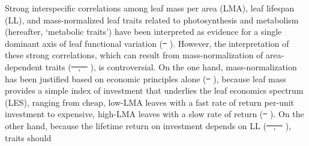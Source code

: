 \documentclass[
  12pt,
  letterpaper,
  DIV=11,
  numbers=noendperiod]{scrartcl}
\providecommand{\DIFadd}[1]{{\protect\color{blue}\uwave{#1}}} %
\providecommand{\DIFdel}[1]{{\protect\color{red}\sout{#1}}}                      %
\providecommand{\DIFaddbegin}{} %
\providecommand{\DIFaddend}{} %
\providecommand{\DIFdelbegin}{} %
\providecommand{\DIFdelend}{} %
\newcommand{\DIFscaledelfig}{0.5}
\newlength{\DIFdelgraphicswidth} %
\newlength{\DIFdelgraphicsheight} %
\newcommand{\DIFaddincludegraphics}[2][]{{\color{blue}\fbox{\DIFOincludegraphics[#1]{#2}}}} %
\newcommand{\DIFdelincludegraphics}[2][]{%
\sbox{\DIFdelgraphicsbox}{\DIFOincludegraphics[#1]{#2}}%
\settoboxwidth{\DIFdelgraphicswidth}{\DIFdelgraphicsbox} %
\settoboxtotalheight{\DIFdelgraphicsheight}{\DIFdelgraphicsbox} %
\scalebox{\DIFscaledelfig}{%
\parbox[b]{\DIFdelgraphicswidth}{\usebox{\DIFdelgraphicsbox}\\[-\baselineskip] \rule{\DIFdelgraphicswidth}{0em}}\llap{\resizebox{\DIFdelgraphicswidth}{\DIFdelgraphicsheight}{%
\setlength{\unitlength}{\DIFdelgraphicswidth}%
\begin{picture}(1,1)%
\thicklines\linethickness{2pt} %
{\color[rgb]{1,0,0}\put(0,0){\framebox(1,1){}}}%
{\color[rgb]{1,0,0}\put(0,0){\line( 1,1){1}}}%
{\color[rgb]{1,0,0}\put(0,1){\line(1,-1){1}}}%
\end{picture}%
}\hspace*{3pt}}} %
} %
\DeclareRobustCommand{\DIFaddbegin}{\DIFOaddbegin \let\includegraphics\DIFaddincludegraphics} %
\DeclareRobustCommand{\DIFaddend}{\DIFOaddend \let\includegraphics\DIFOincludegraphics} %
\DeclareRobustCommand{\DIFdelbegin}{\DIFOdelbegin \let\includegraphics\DIFdelincludegraphics} %
\DeclareRobustCommand{\DIFdelend}{\DIFOaddend \let\includegraphics\DIFOincludegraphics} %
\begin{document}
Strong interspecific correlations among leaf mass per area (LMA), leaf
lifespan (LL), and mass-normalized leaf traits related to photosynthesis
and metabolism (hereafter, `metabolic traits') have been interpreted as
evidence for a single dominant axis of leaf functional variation
(\DIFdelbegin \DIFdel{\mbox{%
\citeproc{ref-Wright2004a}{Wright et al. 2004}}\hspace{0pt}%
}\DIFdelend \DIFaddbegin \DIFadd{\mbox{%
\citeproc{ref-Wright2004a}{Wright et al., 2004}}\hspace{0pt}%
}\DIFaddend ). However, the
interpretation of these strong correlations, which can result from
mass-normalization of area-dependent traits
(\DIFdelbegin \DIFdel{\mbox{%
\citeproc{ref-Lloyd2013}{Lloyd et al. 2013}}\hspace{0pt}%
,
\mbox{%
\citeproc{ref-Osnas2013}{Osnas et al. 2013}}\hspace{0pt}%
}\DIFdelend \DIFaddbegin \DIFadd{\mbox{%
\citeproc{ref-Lloyd2013}{Lloyd et al., 2013}}\hspace{0pt}%
;
\mbox{%
\citeproc{ref-Osnas2013}{Osnas et al., 2013}}\hspace{0pt}%
}\DIFaddend ), is controversial. On the
one hand, mass-normalization has been justified based on economic
principles alone (\DIFdelbegin \DIFdel{\mbox{%
\citeproc{ref-Westoby2013}{Westoby et al. 2013}}\hspace{0pt}%
}\DIFdelend \DIFaddbegin \DIFadd{\mbox{%
\citeproc{ref-Westoby2013}{Westoby et al., 2013}}\hspace{0pt}%
}\DIFaddend ),
because leaf mass provides a simple index of investment that underlies
the leaf economics spectrum (LES), ranging from cheap, low-LMA leaves
with a fast rate of return per-unit investment to expensive, high-LMA
leaves with a slow rate of return (\DIFdelbegin \DIFdel{\mbox{%
\citeproc{ref-Wright2004a}{Wright et
al. 2004}}\hspace{0pt}%
}\DIFdelend \DIFaddbegin \DIFadd{\mbox{%
\citeproc{ref-Wright2004a}{Wright et
al., 2004}}\hspace{0pt}%
}\DIFaddend ). On the other hand, because the lifetime return on
investment depends on LL (\DIFdelbegin \DIFdel{\mbox{%
\citeproc{ref-Westoby2000}{Westoby et al. 2000}}\hspace{0pt}%
,
\mbox{%
\citeproc{ref-Falster2012}{Falster et al. 2012}}\hspace{0pt}%
}\DIFdelend \DIFaddbegin \DIFadd{\mbox{%
\citeproc{ref-Falster2012}{Falster et al.,
2012}}\hspace{0pt}%
; \mbox{%
\citeproc{ref-Westoby2000}{Westoby et al., 2000}}\hspace{0pt}%
}\DIFaddend ), traits should
\end{document}
